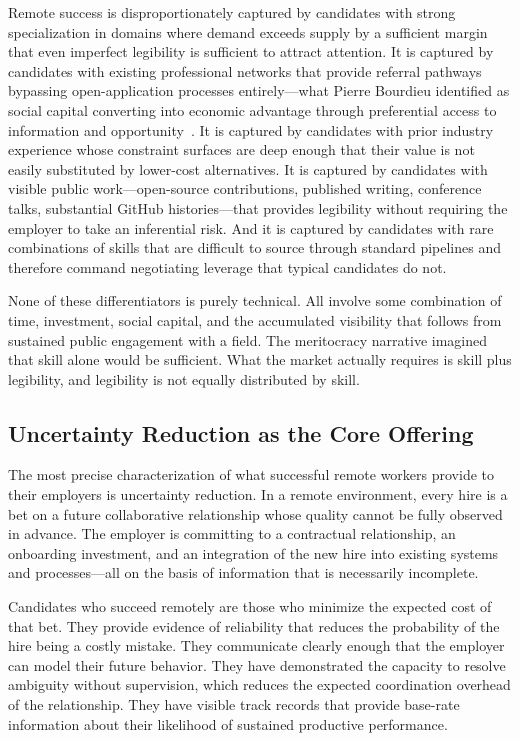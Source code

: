 \documentclass[12pt, a4paper]{article}
\theoremstyle{plain}
\theoremstyle{definition}
\theoremstyle{remark}
\begin{document}
Remote success is disproportionately captured by candidates with strong specialization
in domains where demand exceeds supply by a sufficient margin
that even imperfect legibility is sufficient to attract attention.
It is captured by candidates with existing professional networks that provide
referral pathways bypassing open-application processes entirely---what Pierre Bourdieu
identified as social capital converting into economic advantage through
preferential access to information and opportunity~\cite{bourdieu1986}.
It is captured by candidates with prior industry experience whose constraint surfaces
are deep enough that their value is not easily substituted by lower-cost alternatives.
It is captured by candidates with visible public work---open-source contributions,
published writing, conference talks, substantial GitHub histories---that provides
legibility without requiring the employer to take an inferential risk.
And it is captured by candidates with rare combinations of skills
that are difficult to source through standard pipelines
and therefore command negotiating leverage that typical candidates do not.

None of these differentiators is purely technical.
All involve some combination of time, investment, social capital,
and the accumulated visibility that follows from sustained public engagement
with a field.
The meritocracy narrative imagined that skill alone would be sufficient.
What the market actually requires is skill plus legibility,
and legibility is not equally distributed by skill.

\subsection{Uncertainty Reduction as the Core Offering}

The most precise characterization of what successful remote workers provide
to their employers is uncertainty reduction.
In a remote environment, every hire is a bet on a future collaborative relationship
whose quality cannot be fully observed in advance.
The employer is committing to a contractual relationship,
an onboarding investment, and an integration of the new hire
into existing systems and processes---all on the basis of
information that is necessarily incomplete.

Candidates who succeed remotely are those who minimize the expected cost of that bet.
They provide evidence of reliability that reduces the probability
of the hire being a costly mistake.
They communicate clearly enough that the employer can model their future behavior.
They have demonstrated the capacity to resolve ambiguity without supervision,
which reduces the expected coordination overhead of the relationship.
They have visible track records that provide base-rate information
about their likelihood of sustained productive performance.
\end{document}
